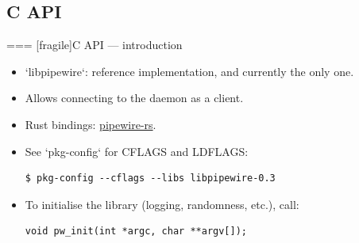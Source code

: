 \subsection{C API}



=== [fragile]{C API — introduction}
  \begin{itemize}

  \item `libpipewire`: reference implementation, and currently the only one.

  \item Allows connecting to the daemon as a client.

  \item Rust bindings:
    \href{https://gitlab.freedesktop.org/pipewire/pipewire-rs}{pipewire-rs}.

  \item See `pkg-config` for CFLAGS and LDFLAGS:

    \begin{verbatim}
$ pkg-config --cflags --libs libpipewire-0.3
    \end{verbatim}

  \item To initialise the library (logging, randomness, etc.), call:
    \begin{verbatim}
void pw_init(int *argc, char **argv[]);
    \end{verbatim}

  \end{itemize}





